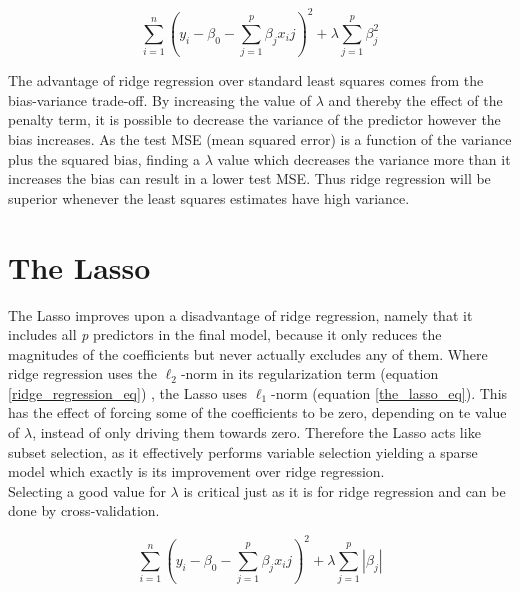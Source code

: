 \begin{equation}
\sum_{i=1}^{n}(y_i - \beta_0 - \sum_{j=1}^{p}\beta_jx_ij)^2 + \lambda\sum_{j=1}^{p}\beta_{j}^{2}\label{ridge_regression_eq}
\end{equation}

The advantage of ridge regression over standard least squares comes from the bias-variance trade-off. By increasing the value of \(\lambda\) and thereby the effect of the penalty term, it is possible to decrease the variance of the predictor however the bias increases. As the test MSE (mean squared error) is a function of the variance plus the squared bias, finding a \(\lambda\) value which decreases the variance more than it increases the bias can result in a lower test MSE. Thus ridge regression will be superior whenever the least squares estimates have high variance.

\section{The Lasso}
The Lasso improves upon a disadvantage of ridge regression, namely that it includes all \emph{p} predictors in the final model, because it only reduces the magnitudes of the coefficients but never actually excludes any of them. Where ridge regression uses the \(\ell_2\)-norm in its regularization term (equation \ref{ridge_regression_eq}) , the Lasso uses \(\ell_1\)-norm (equation \ref{the_lasso_eq}). This has the effect of forcing some of the coefficients to be zero, depending on te value of \(\lambda\), instead of only driving them towards zero. Therefore the Lasso acts like subset selection, as it effectively performs variable selection yielding a sparse model which exactly is its improvement over ridge regression.\\
Selecting a good value for \(\lambda\) is critical just as it is for ridge regression and can be done by cross-validation.

\begin{equation}
\sum_{i=1}^{n}(y_i - \beta_0 - \sum_{j=1}^{p}\beta_jx_ij)^2 + \lambda\sum_{j=1}^{p}|\beta_{j}|\label{the_lasso_eq}
\end{equation}


